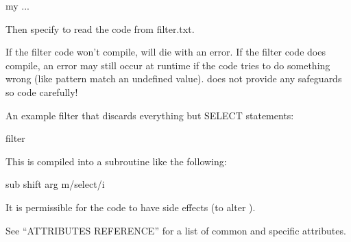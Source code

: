 \documentclass[letterpaper,10pt,english]{sphinxmanual}
\begin{document}
\begin{fulllineitems}
\begin{sphinxVerbatim}[commandchars=\\\{\}]
my   ...        
\end{sphinxVerbatim}

\sphinxAtStartPar
Then specify  to read the code from filter.txt.

\sphinxAtStartPar
If the filter code won’t compile,  will die with an error.
If the filter code does compile, an error may still occur at runtime if the
code tries to do something wrong (like pattern match an undefined value).
 does not provide any safeguards so code carefully!

\sphinxAtStartPar
An example filter that discards everything but SELECT statements:

\begin{sphinxVerbatim}[commandchars=\\\{\}]
\PYGZhy{}\PYGZhy{}filter 
\end{sphinxVerbatim}

\sphinxAtStartPar
This is compiled into a subroutine like the following:

\begin{sphinxVerbatim}[commandchars=\\\{\}]
sub    shift  \PYGZhy{}\PYGZgt{}arg \PYGZti{} m/\PYGZca{}select/i     
\end{sphinxVerbatim}

\sphinxAtStartPar
It is permissible for the code to have side effects (to alter ).

\sphinxAtStartPar
See “ATTRIBUTES REFERENCE” for a list of common and {\hyperref[\detokenize{mariadb-query-digest:cmdoption-mariadb-query-digest-type}]{}} specific
attributes.


\end{fulllineitems}
\end{document}
